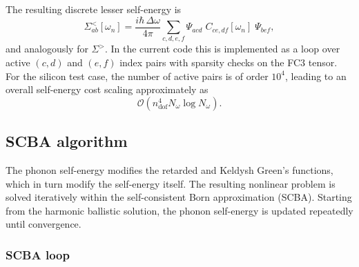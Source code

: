 The resulting discrete lesser self-energy is
\begin{equation}\label{eq:full-energy}
  \Sigma^<_{ab}[\omega_n]
  = \frac{i\hbar\,\Delta\omega}{4\pi}
    \sum_{c,d,e,f}
    \Psi_{acd}\;C_{ce,df}[\omega_n]\;\Psi_{bef},
\end{equation}
and analogously for $\Sigma^>$.  In the current code this is
implemented as a loop over active $(c,d)$ and $(e,f)$ index pairs with
sparsity checks on the FC3 tensor.  For the silicon test case, the
number of active pairs is of order $10^4$, leading to an overall
self-energy cost scaling approximately as
\begin{equation}
  \mathcal{O}(n_\mathrm{dof}^4 N_\omega \log N_\omega).
\end{equation}

\subsection{SCBA algorithm}
\label{sec:scba}

The phonon self-energy modifies the retarded and Keldysh Green's
functions, which in turn modify the self-energy itself.  The resulting
nonlinear problem is solved iteratively within the self-consistent Born
approximation (SCBA).  Starting from the harmonic ballistic solution,
the phonon self-energy is updated repeatedly until convergence.

\subsubsection{SCBA loop}

